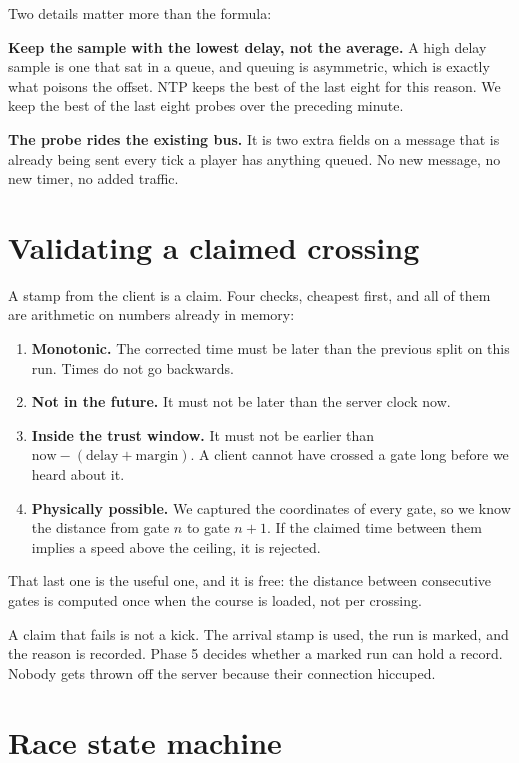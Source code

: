 \documentclass[11pt,a4paper]{article}
\begin{document}
Two details matter more than the formula:

\textbf{Keep the sample with the lowest delay, not the average.} A high delay
sample is one that sat in a queue, and queuing is asymmetric, which is exactly
what poisons the offset. NTP keeps the best of the last eight for this reason.
We keep the best of the last eight probes over the preceding minute.

\textbf{The probe rides the existing bus.} It is two extra fields on a message
that is already being sent every tick a player has anything queued. No new
message, no new timer, no added traffic.
\section{Validating a claimed crossing}

A stamp from the client is a claim. Four checks, cheapest first, and all of
them are arithmetic on numbers already in memory:

\begin{enumerate}
  \item \textbf{Monotonic.} The corrected time must be later than the previous
        split on this run. Times do not go backwards.
  \item \textbf{Not in the future.} It must not be later than the server clock
        now.
  \item \textbf{Inside the trust window.} It must not be earlier than
        $\text{now} - (\text{delay} + \text{margin})$. A client cannot have
        crossed a gate long before we heard about it.
  \item \textbf{Physically possible.} We captured the coordinates of every
        gate, so we know the distance from gate $n$ to gate $n{+}1$. If the
        claimed time between them implies a speed above the ceiling, it is
        rejected.
\end{enumerate}

That last one is the useful one, and it is free: the distance between
consecutive gates is computed once when the course is loaded, not per crossing.

A claim that fails is not a kick. The arrival stamp is used, the run is marked,
and the reason is recorded. Phase 5 decides whether a marked run can hold a
record. Nobody gets thrown off the server because their connection hiccuped.

\section{Race state machine}
\end{document}
